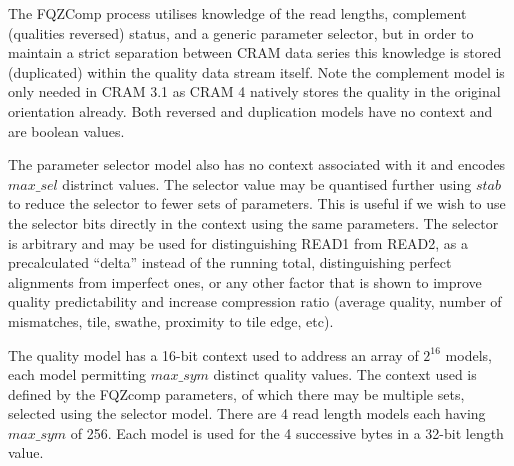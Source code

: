 \documentclass[a4paper]{article}
\begin{document}
The FQZComp process utilises knowledge of the read lengths, complement
(qualities reversed) status, and a generic parameter selector, but in
order to maintain a strict separation between CRAM data series this
knowledge is stored (duplicated) within the quality data stream
itself.  Note the complement model is only needed in CRAM 3.1 as CRAM
4 natively stores the quality in the original orientation already.
Both reversed and duplication models have no context and are boolean
values.

The parameter selector model also has no context associated with it
and encodes $max\_sel$ distrinct values.  The selector value may be
quantised further using $stab$ to reduce the selector to fewer
sets of parameters.  This is useful if we wish to use the selector
bits directly in the context using the same parameters.  The selector
is arbitrary and may be used for distinguishing READ1 from READ2, as
a precalculated ``delta'' instead of the running total, distinguishing
perfect alignments from imperfect ones, or any other factor that is
shown to improve quality predictability and increase compression
ratio (average quality, number of mismatches, tile, swathe, proximity
to tile edge, etc).

The quality model has a 16-bit context used to address an array of
$2^{16}$ models, each model permitting $max\_sym$ distinct quality
values.  The context used is defined by the FQZcomp parameters, of
which there may be multiple sets, selected using the selector model.
There are 4 read length models each having $max\_sym$ of 256.  Each
model is used for the 4 successive bytes in a 32-bit length value.
\end{document}
